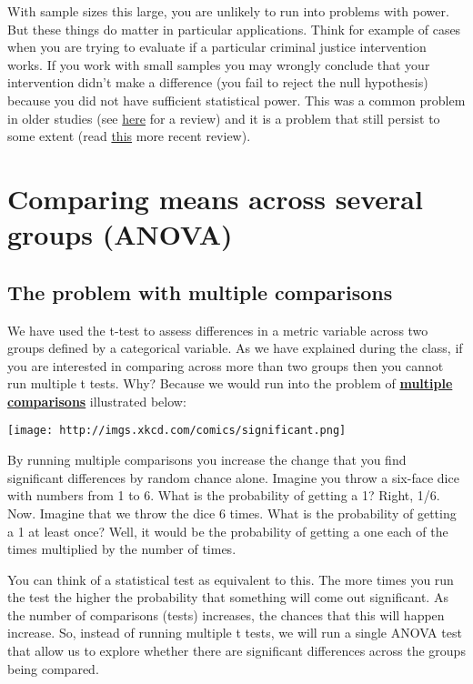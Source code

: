 \documentclass[
]{book}
\begin{document}
With sample sizes this large, you are unlikely to run into problems with power. But these things do matter in particular applications. Think for example of cases when you are trying to evaluate if a particular criminal justice intervention works. If you work with small samples you may wrongly conclude that your intervention didn't make a difference (you fail to reject the null hypothesis) because you did not have sufficient statistical power. This was a common problem in older studies (see \href{https://www.sciencedirect.com/science/article/pii/0047235289900044}{here} for a review) and it is a problem that still persist to some extent (read \href{https://www.tandfonline.com/doi/abs/10.1080/07418825.2018.1495252}{this} more recent review).

\section{Comparing means across several groups (ANOVA)}\label{comparing-means-across-several-groups-anova}

\subsection{The problem with multiple comparisons}\label{the-problem-with-multiple-comparisons}

We have used the t-test to assess differences in a metric variable across two groups defined by a categorical variable. As we have explained during the class, if you are interested in comparing across more than two groups then you cannot run multiple t tests. Why? Because we would run into the problem of \href{http://en.wikipedia.org/wiki/Multiple_comparisons_problem}{\textbf{multiple comparisons}} illustrated below:

\texttt{[image: http://imgs.xkcd.com/comics/significant.png]}

By running multiple comparisons you increase the change that you find significant differences by random chance alone. Imagine you throw a six-face dice with numbers from 1 to 6. What is the probability of getting a 1? Right, 1/6. Now. Imagine that we throw the dice 6 times. What is the probability of getting a 1 at least once? Well, it would be the probability of getting a one each of the times multiplied by the number of times.

You can think of a statistical test as equivalent to this. The more times you run the test the higher the probability that something will come out significant. As the number of comparisons (tests) increases, the chances that this will happen increase. So, instead of running multiple t tests, we will run a single ANOVA test that allow us to explore whether there are significant differences across the groups being compared.
\end{document}
